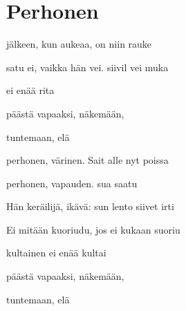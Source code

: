 \documentclass[12pt,a4paper]{article}
\begin{document}
\thispagestyle{empty}
\section*{Perhonen}

\begin{SBVerse}
 jälkeen, kun  aukeaa, on  niin
 rauke

 satu ei, vaikka  hän vei. 
siivil vei muka

  ei  enää
 rita

 päästä vapaaksi,  näkemään,

 tuntemaan,  elä
\end{SBVerse}

\begin{SBChorus}
 perhonen,  värinen.
Sait  alle  nyt poissa 

 perhonen,  vapauden.
 sua saatu 
\end{SBChorus}

\begin{SBVerse*}
\end{SBVerse*}

\begin{SBVerse}
Hän  keräilijä,  ikävä:  sun lento
 siivet irti 

Ei  mitään  kuoriudu, jos ei 
kukaan  suoriu

  kultainen ei  enää
 kultai

 päästä vapaaksi,  näkemään,

 tuntemaan,  elä
\end{SBVerse}
\end{document}
